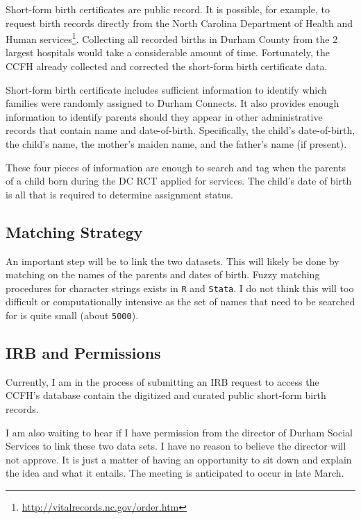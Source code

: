 \documentclass[12pt,letterpaperpaper,]{book}
\renewcommand{\href}[2]{#2\footnote{\url{#1}}}
\begin{document}
Short-form birth certificates are public record. It is possible, for
example, to request birth records directly from the
\href{http://vitalrecords.nc.gov/order.htm}{North Carolina Department of
Health and Human services}. Collecting all recorded births in Durham
County from the 2 largest hospitals would take a considerable amount of
time. Fortunately, the CCFH already collected and corrected the
short-form birth certificate data.

Short-form birth certificate includes sufficient information to identify
which families were randomly assigned to Durham Connects. It also
provides enough information to identify parents should they appear in
other administrative records that contain name and date-of-birth.
Specifically, the child's date-of-birth, the child's name, the mother's
maiden name, and the father's name (if present).

These four pieces of information are enough to search and tag when the
parents of a child born during the DC RCT applied for services. The
child's date of birth is all that is required to determine assignment
status.

\subsection*{Matching Strategy}\label{matching-strategy}

An important step will be to link the two datasets. This will likely be
done by matching on the names of the parents and dates of birth. Fuzzy
matching procedures for character strings exists in \texttt{R} and
\texttt{Stata}. I do not think this will too difficult or
computationally intensive as the set of names that need to be searched
for is quite small (about \texttt{5000}).

\subsection*{IRB and Permissions}\label{irb-and-permissions}

Currently, I am in the process of submitting an IRB request to access
the CCFH's database contain the digitized and curated public short-form
birth records.

I am also waiting to hear if I have permission from the director of
Durham Social Services to link these two data sets. I have no reason to
believe the director will not approve. It is just a matter of having an
opportunity to sit down and explain the idea and what it entails. The
meeting is anticipated to occur in late March.
\end{document}
